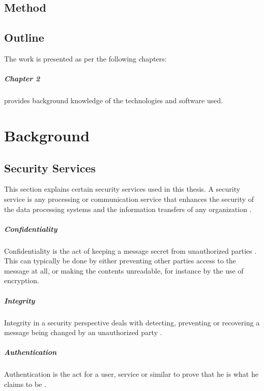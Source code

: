 \documentclass[pdftex,english,10pt,b5paper,twoside]{book}
\begin{document}
\section{Method}

\section{Outline}

The work is presented as per the following chapters:

\paragraph{Chapter 2} provides background knowledge of the technologies and
software used.


\chapter{Background}

\section{Security Services}

This section explains certain security services used in this thesis. A security
service is any processing or communication service that enhances the security of
the data processing systems and the information transfers of any organization
\cite[p. 12]{stallings}.

\paragraph{Confidentiality} Confidentiality is the act of keeping a message
secret from unauthorized parties \cite[p. 18]{stallings}. This can typically be
done by either preventing other parties access to the message at all, or making
the contents unreadable, for instance by the use of encryption.

\paragraph{Integrity} Integrity in a security perspective deals with detecting,
preventing or recovering a message being changed by an unauthorized party
\cite{stallings}.

\paragraph{Authentication} Authentication is the act for a user, service or
similar to prove that he is what he claims to be \cite{stallings}.
\end{document}
